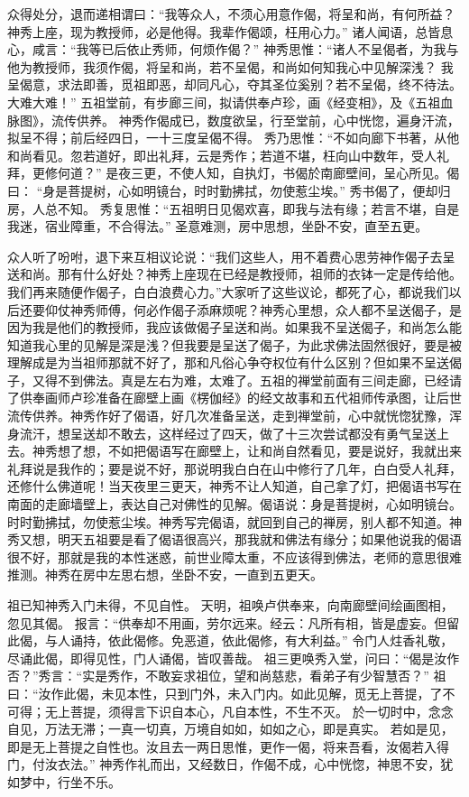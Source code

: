 \documentclass[12pt,twoside,openany]{book}
\newcommand{\kai}[1]{{\CJKfamily{kai}#1}}
\begin{document}
众得处分，退而递相谓曰：“我等众人，不须心用意作偈，将呈和尚，有何所益？神秀上座，现为教授师，必是他得。我辈作偈颂，枉用心力。”
诸人闻语，总皆息心，咸言：“我等已后依止秀师，何烦作偈？”
神秀思惟：“诸人不呈偈者，为我与他为教授师，我须作偈，将呈和尚，若不呈偈，和尚如何知我心中见解深浅？
我呈偈意，求法即善，觅祖即恶，却同凡心，夺其圣位奚别？若不呈偈，终不待法。大难大难！”
五祖堂前，有步廊三间，拟请供奉卢珍，画《经变相》，及《五祖血脉图》，流传供养。
神秀作偈成已，数度欲呈，行至堂前，心中恍惚，遍身汗流，拟呈不得；前后经四日，一十三度呈偈不得。
秀乃思惟：“不如向廊下书著，从他和尚看见。忽若道好，即出礼拜，云是秀作；若道不堪，枉向山中数年，受人礼拜，更修何道？”
是夜三更，不使人知，自执灯，书偈於南廊壁间，呈心所见。偈曰：
“身是菩提树，心如明镜台，时时勤拂拭，勿使惹尘埃。”
秀书偈了，便却归房，人总不知。
秀复思惟：“五祖明日见偈欢喜，即我与法有缘；若言不堪，自是我迷，宿业障重，不合得法。”
圣意难测，房中思想，坐卧不安，直至五更。

\kai{众人听了吩咐，退下来互相议论说：“我们这些人，用不着费心思劳神作偈子去呈送和尚。那有什么好处？神秀上座现在已经是教授师，祖师的衣钵一定是传给他。我们再来随便作偈子，白白浪费心力。”大家听了这些议论，都死了心，都说我们以后还要仰仗神秀师傅，何必作偈子添麻烦呢？神秀心里想，众人都不呈送偈子，是因为我是他们的教授师，我应该做偈子呈送和尚。如果我不呈送偈子，和尚怎么能知道我心里的见解是深是浅？但我要是呈送了偈子，为此求佛法固然很好，要是被理解成是为当祖师那就不好了，那和凡俗心争夺权位有什么区别？但如果不呈送偈子，又得不到佛法。真是左右为难，太难了。五祖的禅堂前面有三间走廊，已经请了供奉画师卢珍准备在廊壁上画《楞伽经》的经文故事和五代祖师传承图，让后世流传供养。神秀作好了偈语，好几次准备呈送，走到禅堂前，心中就恍惚犹豫，浑身流汗，想呈送却不敢去，这样经过了四天，做了十三次尝试都没有勇气呈送上去。神秀想了想，不如把偈语写在廊壁上，让和尚自然看见，要是说好，我就出来礼拜说是我作的；要是说不好，那说明我白白在山中修行了几年，白白受人礼拜，还修什么佛道呢！当天夜里三更天，神秀不让人知道，自己拿了灯，把偈语书写在南面的走廊墙壁上，表达自己对佛性的见解。偈语说：身是菩提树，心如明镜台。时时勤拂拭，勿使惹尘埃。神秀写完偈语，就回到自己的禅房，别人都不知道。神秀又想，明天五祖要是看了偈语很高兴，那我就和佛法有缘分；如果他说我的偈语很不好，那就是我的本性迷惑，前世业障太重，不应该得到佛法，老师的意思很难推测。神秀在房中左思右想，坐卧不安，一直到五更天。}

祖已知神秀入门未得，不见自性。
天明，祖唤卢供奉来，向南廊壁间绘画图相，忽见其偈。
报言：“供奉却不用画，劳尔远来。经云：凡所有相，皆是虚妄。但留此偈，与人诵持，依此偈修。免恶道，依此偈修，有大利益。”
令门人炷香礼敬，尽诵此偈，即得见性，门人诵偈，皆叹善哉。
祖三更唤秀入堂，问曰：“偈是汝作否？”秀言：“实是秀作，不敢妄求祖位，望和尚慈悲，看弟子有少智慧否？”
祖曰：“汝作此偈，未见本性，只到门外，未入门内。如此见解，觅无上菩提，了不可得；无上菩提，须得言下识自本心，凡自本性，不生不灭。
於一切时中，念念自见，万法无滞；一真一切真，万境自如如，如如之心，即是真实。
若如是见，即是无上菩提之自性也。汝且去一两日思惟，更作一偈，将来吾看，汝偈若入得门，付汝衣法。”
神秀作礼而出，又经数日，作偈不成，心中恍惚，神思不安，犹如梦中，行坐不乐。
\end{document}
